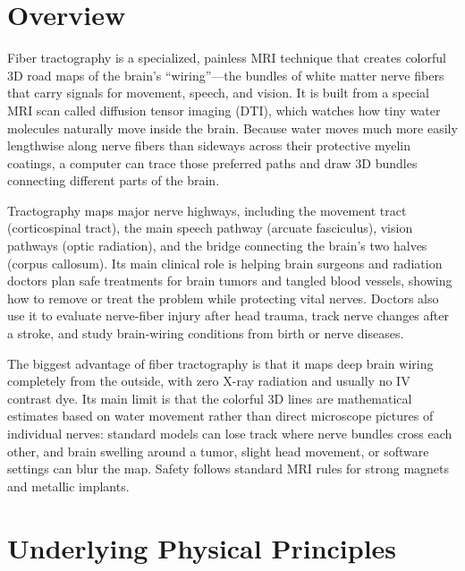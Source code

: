 \label{ch:infographic-ft}

\section{Overview}

Fiber tractography is a specialized, painless MRI technique that creates colorful 3D road maps of the brain's ``wiring''---the bundles of white matter nerve fibers that carry signals for movement, speech, and vision. It is built from a special MRI scan called diffusion tensor imaging (DTI), which watches how tiny water molecules naturally move inside the brain. Because water moves much more easily lengthwise along nerve fibers than sideways across their protective myelin coatings, a computer can trace those preferred paths and draw 3D bundles connecting different parts of the brain.

Tractography maps major nerve highways, including the movement tract (corticospinal tract), the main speech pathway (arcuate fasciculus), vision pathways (optic radiation), and the bridge connecting the brain's two halves (corpus callosum). Its main clinical role is helping brain surgeons and radiation doctors plan safe treatments for brain tumors and tangled blood vessels, showing how to remove or treat the problem while protecting vital nerves. Doctors also use it to evaluate nerve-fiber injury after head trauma, track nerve changes after a stroke, and study brain-wiring conditions from birth or nerve diseases.

The biggest advantage of fiber tractography is that it maps deep brain wiring completely from the outside, with zero X-ray radiation and usually no IV contrast dye. Its main limit is that the colorful 3D lines are mathematical estimates based on water movement rather than direct microscope pictures of individual nerves: standard models can lose track where nerve bundles cross each other, and brain swelling around a tumor, slight head movement, or software settings can blur the map. Safety follows standard MRI rules for strong magnets and metallic implants.

\section{Underlying Physical Principles}

